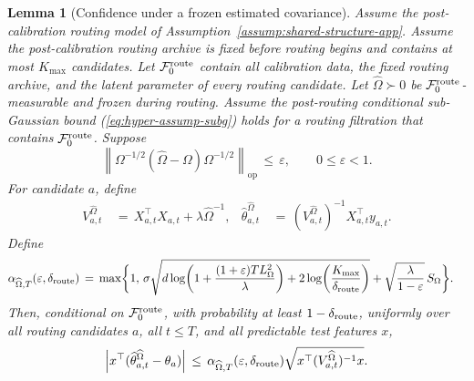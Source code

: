 \documentclass{article} %
\newtheorem{lemma}[theorem]{Lemma}
\renewcommand{\eqref}[1]{\textup{(\ref{#1})}}
\begin{document}
\begin{lemma}[Confidence under a frozen estimated covariance]
\label{lem:confidence-under-frozen-omegahat-final}
Assume the post-calibration routing model of
Assumption~\ref{assump:shared-structure-app}.  Assume the post-calibration
routing archive is fixed before routing begins and contains at most
\(K_{\max}\) candidates. Let \(\mathcal F_0^{\rm route}\) contain all
calibration data, the fixed routing archive, and the latent parameter of every
routing candidate.
Let \(\widehat\Omega\succ0\) be
\(\mathcal F_0^{\rm route}\)-measurable and frozen during routing. Assume the
post-routing conditional sub-Gaussian bound
\eqref{eq:hyper-assump-subg} holds for a routing filtration that contains
\(\mathcal F_0^{\rm route}\). Suppose
\begin{equation}
\left\|
\Omega^{-1/2}(\widehat\Omega-\Omega)\Omega^{-1/2}
\right\|_{\mathrm{op}}
\,\leq\,
\varepsilon,
\qquad
0\leq\varepsilon<1.
\end{equation}
For candidate \(a\), define
\begin{equation}
\begin{aligned}
V_{a,t}^{\widehat\Omega}
&\,=\,
X_{a,t}^\top X_{a,t}+\lambda\widehat\Omega^{-1},
&
\widehat\theta_{a,t}^{\widehat\Omega}
&\,=\,
(V_{a,t}^{\widehat\Omega})^{-1}X_{a,t}^\top y_{a,t}.
\end{aligned}
\end{equation}
Define
\begin{equation}
\begin{aligned}
\alpha_{\widehat\Omega,T}(\varepsilon,\delta_{\rm route})
&\,=\,
\max\!\bigg\{
1,\,
\sigma\sqrt{
d\log\!\left(1+\frac{(1+\varepsilon)TL_\Omega^2}{\lambda}\right)
+
2\log\!\left(\frac{K_{\max}}{\delta_{\rm route}}\right)
}
+
\sqrt{\frac{\lambda}{1-\varepsilon}}\,S_\Omega
\bigg\}.
\end{aligned}
\end{equation}
Then, conditional on \(\mathcal F_0^{\rm route}\), with probability at least
\(1-\delta_{\rm route}\), uniformly over all routing candidates \(a\), all
\(t\le T\), and all predictable test features \(x\),
\begin{equation}
\left|
x^\top(\widehat\theta_{a,t}^{\widehat\Omega}-\theta_a)
\right|
\,\leq\,
\alpha_{\widehat\Omega,T}(\varepsilon,\delta_{\rm route})
\sqrt{x^\top(V_{a,t}^{\widehat\Omega})^{-1}x}.
\end{equation}
\end{lemma}
\end{document}
